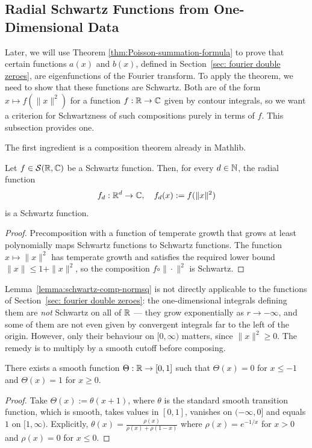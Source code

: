 \subsection{Radial Schwartz Functions from One-Dimensional Data}\label{subsec:radial-schwartz-bridge}

Later, we will use Theorem \ref{thm:Poisson-summation-formula} to prove that certain functions $a(x)$ and $b(x)$, defined in Section~\ref{sec: fourier double zeroes}, are eigenfunctions of the Fourier transform. To apply the theorem, we need to show that these functions are Schwartz. Both are of the form $x \mapsto f(\|x\|^2)$ for a function $f : \mathbb{R} \to \mathbb{C}$ given by contour integrals, so we want a criterion for Schwartzness of such compositions purely in terms of $f$. This subsection provides one.

The first ingredient is a composition theorem already in Mathlib.

\begin{lemma}\label{lemma:schwartz-comp-normsq}\leanok
  Let $f \in \mathcal{S}(\mathbb{R}, \mathbb{C})$ be a Schwartz function. Then, for every $d \in \mathbb{N}$, the radial function
  \[
    f_d : \mathbb{R}^d \to \mathbb{C}, \quad f_d(x) := f(\|x\|^2)
  \]
  is a Schwartz function.
\end{lemma}
\begin{proof}\leanok
  Precomposition with a function of temperate growth that grows at least polynomially maps Schwartz functions to Schwartz functions. The function $x \mapsto \|x\|^2$ has temperate growth and satisfies the required lower bound $\|x\| \le 1 + \|x\|^2$, so the composition $f \circ \|\cdot\|^2$ is Schwartz.
\end{proof}

Lemma~\ref{lemma:schwartz-comp-normsq} is not directly applicable to the functions of Section~\ref{sec: fourier double zeroes}: the one-dimensional integrals defining them are \emph{not} Schwartz on all of $\mathbb{R}$ --- they grow exponentially as $r \to -\infty$, and some of them are not even given by convergent integrals far to the left of the origin. However, only their behaviour on $[0, \infty)$ matters, since $\|x\|^2 \geq 0$. The remedy is to multiply by a smooth cutoff before composing.

\begin{lemma}\label{lemma:smooth-cutoff}\leanok\mathlibok
  There exists a smooth function $\Theta : \mathbb{R} \to [0, 1]$ such that $\Theta(x) = 0$ for $x \leq -1$ and $\Theta(x) = 1$ for $x \geq 0$.
\end{lemma}
\begin{proof}
  Take $\Theta(x) := \theta(x + 1)$, where $\theta$ is the standard smooth transition function, which is smooth, takes values in $[0,1]$, vanishes on $(-\infty, 0]$ and equals $1$ on $[1, \infty)$. Explicitly, $\theta(x) = \frac{\rho(x)}{\rho(x) + \rho(1-x)}$ where $\rho(x) = e^{-1/x}$ for $x > 0$ and $\rho(x) = 0$ for $x \leq 0$.
\end{proof}

